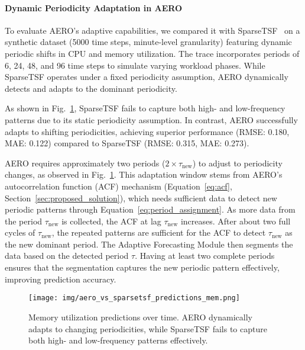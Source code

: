 \documentclass{ieeetmlcn}
\begin{document}
\paragraph*{Dynamic Periodicity Adaptation in AERO}
\label{sec:dynamicperiodicity}

To evaluate AERO's adaptive capabilities, we compared it with SparseTSF~\cite{sparseTSF} on a synthetic dataset (5000 time steps, minute-level granularity) featuring dynamic periodic shifts in CPU and memory utilization. The trace incorporates periods of 6, 24, 48, and 96 time steps to simulate varying workload phases. While SparseTSF operates under a fixed periodicity assumption, AERO dynamically detects and adapts to the dominant periodicity.

As shown in Fig.~\ref{fig:aero_vs_sparsetsf_predictions_mem}, SparseTSF fails to capture both high- and low-frequency patterns due to its static periodicity assumption. In contrast, AERO successfully adapts to shifting periodicities, achieving superior performance (RMSE: 0.180, MAE: 0.122) compared to SparseTSF (RMSE: 0.315, MAE: 0.273).

AERO requires approximately two periods ($2 \times \tau_{\text{new}}$) to adjust to periodicity changes, as observed in Fig.~\ref{fig:aero_vs_sparsetsf_predictions_mem}. This adaptation window stems from AERO's autocorrelation function (ACF) mechanism (Equation~\ref{eq:acf}, Section~\ref{sec:proposed_solution}), which needs sufficient data to detect new periodic patterns through Equation~\ref{eq:period_assignment}. As more data from the period $\tau_{\text{new}}$ is collected, the ACF at lag $\tau_{\text{new}}$ increases. After about two full cycles of $\tau_{\text{new}}$, the repeated patterns are sufficient for the ACF to detect $\tau_{\text{new}}$ as the new dominant period. The Adaptive Forecasting Module then segments the data based on the detected period $\tau$. Having at least two complete periods ensures that the segmentation captures the new periodic pattern effectively, improving prediction accuracy.

\begin{figure}\centering
\centering
\centering\texttt{[image: img/aero\_vs\_sparsetsf\_predictions\_mem.png]}
\caption{Memory utilization predictions over time. AERO dynamically adapts to changing periodicities, while SparseTSF fails to capture both high- and low-frequency patterns effectively.}
\label{fig:aero_vs_sparsetsf_predictions_mem}
\end{figure}
\end{document}
